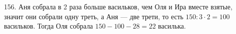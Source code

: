 156. Аня собрала в 2 раза больше васильков, чем Оля и Ира вместе взятые, значит они собрали одну треть, а Аня --- две трети, то есть $150:3\cdot2=100$ васильков. Тогда Оля собрала $150-100-28=22$ василька.\\
